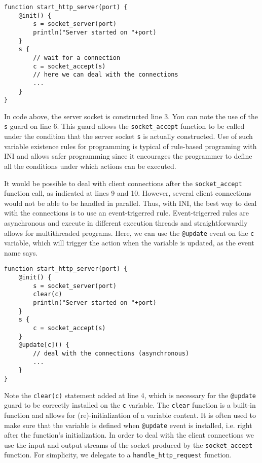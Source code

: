 \documentclass[11pt]{article}
\begin{document}
\begin{lstlisting}
function start_http_server(port) {
	@init() {
		s = socket_server(port)
		println("Server started on "+port)
	}
	s {
		// wait for a connection
		c = socket_accept(s)
		// here we can deal with the connections
		...
	}
}
\end{lstlisting}

In code above, the server socket is constructed line 3. You can note the use of the \texttt{s} guard on line 6. This guard allows the \texttt{socket\_accept} function to be called under the condition that the server socket \texttt{s} is actually constructed. Use of such variable existence rules for programming is typical of rule-based programing with INI and allows safer programming since it encourages the programmer to define all the conditions under which actions can be executed.

It would be possible to deal with client connections after the \texttt{socket\_accept} function call, as indicated at lines 9 and 10. However, several client connections would not be able to be handled in parallel. Thus, with INI, the best way to deal with the connections is to use an event-trigerred rule. Event-trigerred rules are asynchronous and execute in different execution threads and straightforwardly allows for multithreaded programs. Here, we can use the \texttt{@update} event on the \texttt{c} variable, which will trigger the action when the variable is updated, as the event name says.

\begin{lstlisting}
function start_http_server(port) {
	@init() {
		s = socket_server(port)
		clear(c)
		println("Server started on "+port)
	}
	s {
		c = socket_accept(s)
	}
	@update[c]() {
		// deal with the connections (asynchronous)
		...
	}
}
\end{lstlisting}

Note the \texttt{clear(c)} statement added at line 4, which is necessary for the \texttt{@update} guard to be correctly installed on the \texttt{c} variable. The \texttt{clear} function is a built-in function and allows for (re)-initialization of a variable content. It is often used to make sure that the variable is defined when \texttt{@update} event is installed, i.e. right after the function's initialization. In order to deal with the client connections we use the input and output streams of the socket produced by the \texttt{socket\_accept} function. For simplicity, we delegate to a \texttt{handle\_http\_request} function.
\end{document}
